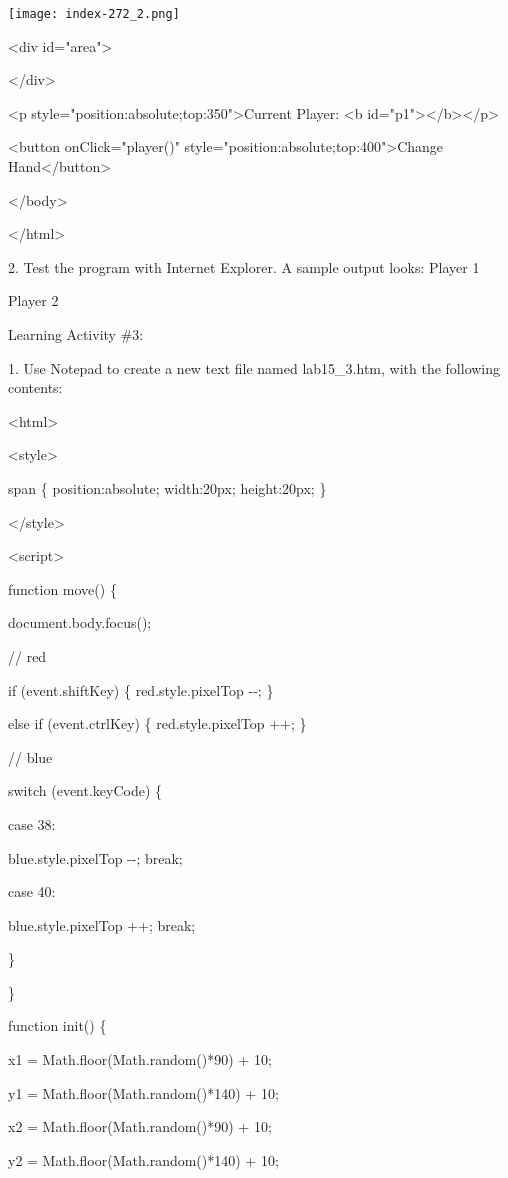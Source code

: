 \documentclass[
]{article}
\begin{document}
\texttt{[image: index-272\_2.png]}

\textless div id="area"\textgreater{}

\textless/div\textgreater{}

\textless p style="position:absolute;top:350"\textgreater Current
Player: \textless b
id="p1"\textgreater\textless/b\textgreater\textless/p\textgreater{}

\textless button onClick="player()"
style="position:absolute;top:400"\textgreater Change
Hand\textless/button\textgreater{}

\textless/body\textgreater{}

\textless/html\textgreater{}

2. Test the program with Internet Explorer. A sample output looks:
Player 1

Player 2

Learning Activity \#3:

1. Use Notepad to create a new text file named lab15\_3.htm, with the
following contents:

\textless html\textgreater{}

\textless style\textgreater{}

span \{ position:absolute; width:20px; height:20px; \}

\textless/style\textgreater{}

\textless script\textgreater{}

function move() \{

document.body.focus();

// red

if (event.shiftKey) \{ red.style.pixelTop -\/-; \}

else if (event.ctrlKey) \{ red.style.pixelTop ++; \}

// blue

switch (event.keyCode) \{

case 38:

blue.style.pixelTop -\/-; break;

case 40:

blue.style.pixelTop ++; break;

\}

\}

function init() \{

x1 = Math.floor(Math.random()*90) + 10;

y1 = Math.floor(Math.random()*140) + 10;

x2 = Math.floor(Math.random()*90) + 10;

y2 = Math.floor(Math.random()*140) + 10;
\end{document}
